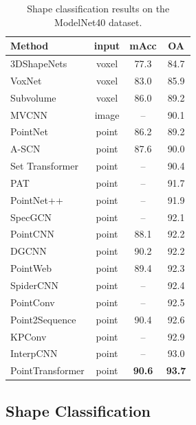 \begin{table}[h]
	\centering
	\begin{tabular}{ l | c c c}
		\toprule[1pt]
		Method & input & mAcc & OA \\
		\hline
		3DShapeNets~\cite{wu2015modelnet} & voxel & 77.3 & 84.7 \\
		VoxNet~\cite{maturana2015voxnet} & voxel & 83.0 & 85.9 \\
		Subvolume~\cite{qi2016volumetric} & voxel & 86.0 & 89.2 \\
		MVCNN~\cite{su15mvcnn} & image & -- & 90.1 \\
		PointNet~\cite{qi2017pointnet} & point & 86.2 & 89.2 \\
		A-SCN~\cite{xie2018attentional} & point & 87.6 & 90.0 \\
		Set Transformer~\cite{lee2019set} & point & -- & 90.4 \\
		PAT~\cite{yang2019modeling} & point & -- & 91.7 \\
		PointNet++~\cite{qi2017pointnet2} & point & -- & 91.9 \\
		SpecGCN~\cite{wang2018local} & point & -- & 92.1 \\
		PointCNN~\cite{li2018pointcnn} & point & 88.1 & 92.2 \\
		DGCNN~\cite{wang2019dgcnn} & point & 90.2 & 92.2 \\
		PointWeb~\cite{zhao2019pointweb} & point & 89.4 & 92.3 \\
		SpiderCNN~\cite{xu2018spidercnn} & point & -- & 92.4 \\
		PointConv~\cite{wu2019pointconv} & point & -- & 92.5 \\
		Point2Sequence~\cite{liu2019point2sequence} & point & 90.4 & 92.6 \\
		KPConv~\cite{thomas2019kpconv} & point & -- & 92.9 \\
		InterpCNN~\cite{mao2019interpolated} & point & -- & 93.0 \\
		\hline
		PointTransformer & point & \textbf{90.6} & \textbf{93.7} \\
		\bottomrule[1pt]
	\end{tabular}
	\caption{Shape classification results on the ModelNet40 dataset.}
	\label{tab:modelnet40result}
	\vspace{-2mm}
\end{table}

\subsection{Shape Classification}

